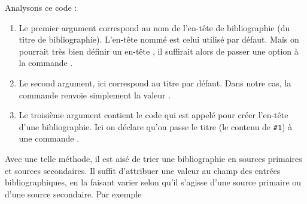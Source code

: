 Analysons ce code :
\begin{enumerate}
\item Le premier argument correspond au nom de l'en-tête de bibliographie (du titre de bibliographie). L'en-tête nommé  est celui utilisé par défaut. Mais on pourrait très bien définir un en-tête , il suffirait alors de passer une option  à la commande .


\item Le second argument, ici  correspond au titre par défaut. Dans notre cas, la commande  renvoie simplement la valeur .
\item Le troisième argument contient le code qui est appelé pour créer l'en-tête d'une bibliographie. Ici on déclare qu'on passe le titre (le contenu de \verb|#1|) à une commande .
\end{enumerate}


Avec une telle méthode, il est aisé de trier une bibliographie en sources primaires et sources secondaires. Il suffit d'attribuer une valeur au champ  des entrées bibliographiques, en la faisant varier selon qu'il s'agisse d'une source primaire ou d'une source secondaire.
Par exemple


